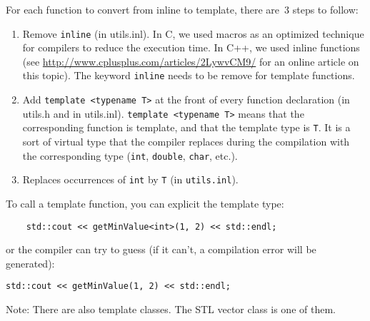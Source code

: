 For each function to convert from inline to template, there are~3 steps to follow:
\begin{enumerate}
 \item Remove \verb'inline' (in utils.inl).
      In C, we used macros as an optimized technique for compilers to reduce the execution time. In C++, we used inline functions (see \url{http://www.cplusplus.com/articles/2LywvCM9/} for an online article on this topic). The keyword \verb'inline' needs to be remove for template functions.

 \item Add \verb'template <typename T>' at the front of every function declaration (in utils.h and in utils.inl). \verb'template <typename T>' means that the corresponding function is template, and that the template type is \verb'T'. It is a sort of virtual type that the compiler replaces during the compilation with the corresponding type (\verb'int', \verb'double', \verb'char', etc.). 
 
 \item Replaces occurrences of \verb'int' by \verb'T' (in \verb'utils.inl').
\end{enumerate}
To call a template function, you can explicit the template type:
\begin{lstlisting}
    std::cout << getMinValue<int>(1, 2) << std::endl;
\end{lstlisting}
or the compiler can try to guess (if it can't, a compilation error will be generated):
\begin{lstlisting}
std::cout << getMinValue(1, 2) << std::endl;
\end{lstlisting}

Note: There are also template classes. The STL vector class is one of them.
